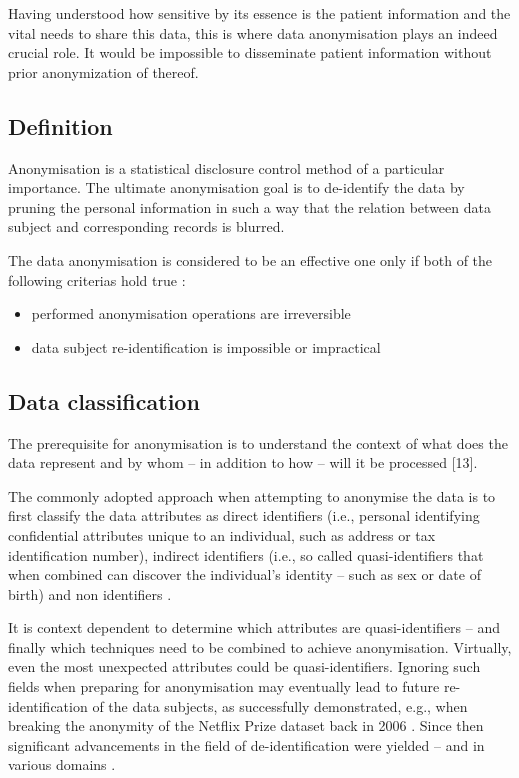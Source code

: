 \documentclass[a4paper,twoside,12pt]{book}
\begin{document}
Having understood how sensitive by its essence is the patient information and the vital needs to share this data, this is where data anonymisation plays an indeed crucial role. It would be impossible to disseminate patient information without prior anonymization of thereof.

\subsection{Definition}

Anonymisation is a statistical disclosure control method of a particular importance. The ultimate anonymisation goal is to de-identify the data by pruning the personal information in such a way that the relation between data subject and corresponding records is blurred.

The data anonymisation is considered to be an effective one only if both of the following criterias hold true \cite{bib:anonymization_taxa}:
\begin{itemize}
\item performed anonymisation operations are irreversible
\item data subject re-identification is impossible or impractical 
\end{itemize}

\subsection{Data classification}

The prerequisite for anonymisation is to understand the context of what does the data represent and by whom – in addition to how – will it be processed [13]. 

The commonly adopted approach when attempting to anonymise the data is to first classify the data attributes as direct identifiers (i.e., personal identifying confidential attributes unique to an individual, such as address or tax identification number), indirect identifiers (i.e., so called quasi-identifiers that when combined can discover the individual's identity – such as sex or date of birth) and non identifiers \cite{bib:privacy_unesco_bigdata}\cite{bib:anonymizing_health_data}.

It is context dependent to determine which attributes are quasi-identifiers – and finally which techniques need to be combined to achieve anonymisation. Virtually, even the most unexpected attributes could be quasi-identifiers. Ignoring such fields when preparing for anonymisation may eventually lead to future re-identification of the data subjects, as successfully demonstrated, e.g., when breaking the anonymity of the Netflix Prize dataset back in 2006 \cite{bib:netflix}. Since then significant advancements in the field of de-identification were yielded – and in various domains \cite{bib:netflix_decade_later}.
\end{document}
